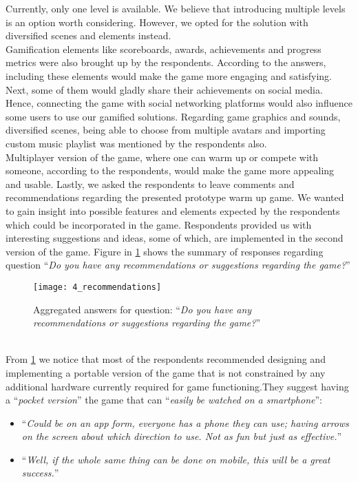 Currently, only one level is available. We believe that introducing multiple levels is an option worth considering. However, we opted for the solution with diversified scenes and elements instead. \\Gamification elements like scoreboards, awards, achievements and progress metrics were also brought up by the respondents. %
According to the answers, including these elements would make the game more engaging and satisfying. Next, some of them would gladly share their achievements on social media. Hence, connecting the game with social networking platforms would also influence some users to use our gamified solutions. Regarding game graphics and sounds, diversified scenes, being able to choose from multiple avatars and importing custom music playlist was mentioned by the respondents also. \\Multiplayer version of the game, where one can warm up or compete with someone, according to the respondents, would make the game more appealing and usable. Lastly, we asked the respondents to leave comments and recommendations regarding the presented prototype warm up game. We wanted to gain insight into possible features and elements expected by the respondents which could be incorporated in the game. Respondents provided us with interesting suggestions and ideas, some of which, are implemented in the second version of the game. Figure in \ref{fig:4_recommendations} shows the summary of responses regarding question ``\textit{Do you have any recommendations or suggestions regarding the game?}''\\
\begin{figure}[h]
    \centering
    \texttt{[image: 4\_recommendations]}
    \caption{Aggregated answers for question: ``\textit{Do you have any recommendations or suggestions regarding the game?}''}
    \label{fig:4_recommendations}
\end{figure}\\ 
From \ref{fig:4_recommendations} we notice that most of the respondents recommended designing and implementing a portable version of the game that is not constrained by any additional hardware currently required for game functioning.They suggest having a ``\textit{pocket version}'' the game that can ``\textit{easily be watched on a smartphone}'':
\begin{itemize}
\item ``\textit{Could be on an app form, everyone has a phone they can use; having arrows on the screen about which direction to use. Not as fun but just as effective.}''
\item ``\textit{Well, if the whole same thing can be done on mobile, this will be a great success.}''
\end{itemize}
